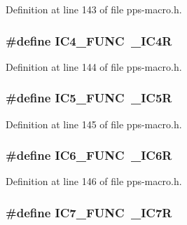 Definition at line 143 of file pps-\/macro.\+h.

\hypertarget{pps-macro_8h_a5633cc87f170e2c7075d45e2da2f1cd7}{}
\subsubsection[{I\+C4\+\_\+\+F\+U\+N\+C}]{\setlength{\rightskip}{0pt plus 5cm}\#define I\+C4\+\_\+\+F\+U\+N\+C~\+\_\+\+I\+C4\+R}\label{pps-macro_8h_a5633cc87f170e2c7075d45e2da2f1cd7}


Definition at line 144 of file pps-\/macro.\+h.

\hypertarget{pps-macro_8h_ab772871aeb3b6c2a912a374e86fafa77}{}
\subsubsection[{I\+C5\+\_\+\+F\+U\+N\+C}]{\setlength{\rightskip}{0pt plus 5cm}\#define I\+C5\+\_\+\+F\+U\+N\+C~\+\_\+\+I\+C5\+R}\label{pps-macro_8h_ab772871aeb3b6c2a912a374e86fafa77}


Definition at line 145 of file pps-\/macro.\+h.

\hypertarget{pps-macro_8h_a233123e0add4fc17580fb28249380f1a}{}
\subsubsection[{I\+C6\+\_\+\+F\+U\+N\+C}]{\setlength{\rightskip}{0pt plus 5cm}\#define I\+C6\+\_\+\+F\+U\+N\+C~\+\_\+\+I\+C6\+R}\label{pps-macro_8h_a233123e0add4fc17580fb28249380f1a}


Definition at line 146 of file pps-\/macro.\+h.

\hypertarget{pps-macro_8h_abf96da1eda3c35684e8915f1a307d3a6}{}
\subsubsection[{I\+C7\+\_\+\+F\+U\+N\+C}]{\setlength{\rightskip}{0pt plus 5cm}\#define I\+C7\+\_\+\+F\+U\+N\+C~\+\_\+\+I\+C7\+R}\label{pps-macro_8h_abf96da1eda3c35684e8915f1a307d3a6}



